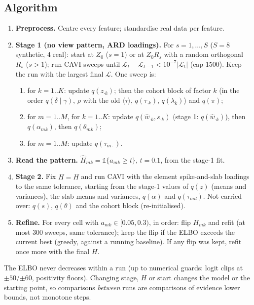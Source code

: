 \documentclass[11pt,a4paper]{article}
\newcommand{\ELBO}{\mathcal{L}}
\newcommand{\wh}{\hat w}
\theoremstyle{definition}
\theoremstyle{remark}
\begin{document}
\subsection{Algorithm}
\begin{enumerate}[label=\textbf{Step \arabic*.},leftmargin=3.2em,itemsep=3pt]
\item \textbf{Preprocess.} Centre every feature; standardise real data per feature.
\item \textbf{Stage 1 (no view pattern, ARD loadings).} For $s=1,\dots,S$ ($S=8$ synthetic, $4$ real): start at $Z_0$
  ($s=1$) or at $Z_0R_s$ with a random orthogonal $R_s$ ($s>1$); run CAVI sweeps until
  $\ELBO_t-\ELBO_{t-1}<10^{-7}|\ELBO_t|$ (cap 1500). Keep the run with the largest final $\ELBO$. One sweep is:
  \begin{enumerate}[label=(\alph*),itemsep=0pt]
  \item for $k=1..K$: update $q(z_{\cdot k})$; then the cohort block of factor $k$ (in the order $q(\delta\mid\gamma)$, $\rho$ with
    the old $\langle\tau\rangle$, $q(\tau_{\cdot k})$, $q(\lambda_k)$) and $q(\pi)$;
  \item for $m=1..M$, for $k=1..K$: update $q(\wh_{\cdot k},s_{\cdot k})$ (stage 1: $q(\wh_{\cdot k})$), then $q(\alpha_{mk})$, then $q(\theta_{mk})$;
  \item for $m=1..M$: update $q(\tau_{m\cdot})$.
  \end{enumerate}
\item \textbf{Read the pattern.} $\hat H_{mk}=\mathbb 1\{a_{mk}\ge t\}$, $t=0.1$, from the stage-1 fit.
\item \textbf{Stage 2.} Fix $H=\hat H$ and run CAVI with the element spike-and-slab loadings to the same tolerance,
  starting from the stage-1 values of $q(z)$ (means and variances), the slab means and variances, $q(\alpha)$ and
  $q(\tau_{md})$. Not carried over: $q(s)$, $q(\theta)$ and the cohort block (re-initialised).
\item \textbf{Refine.} For every cell with $a_{mk}\in[0.05,0.3)$, in order: flip $H_{mk}$ and refit (at most 300 sweeps, same
  tolerance); keep the flip if the ELBO exceeds the current best (greedy, against a running baseline). If any flip was
  kept, refit once more with the final $H$.
\end{enumerate}
The ELBO never decreases within a run (up to numerical guards: logit clips at $\pm50$/$\pm60$, positivity floors).
Changing stage, $H$ or start changes the model or the starting point, so comparisons \emph{between} runs are
comparisons of evidence lower bounds, not monotone steps.
\end{document}
